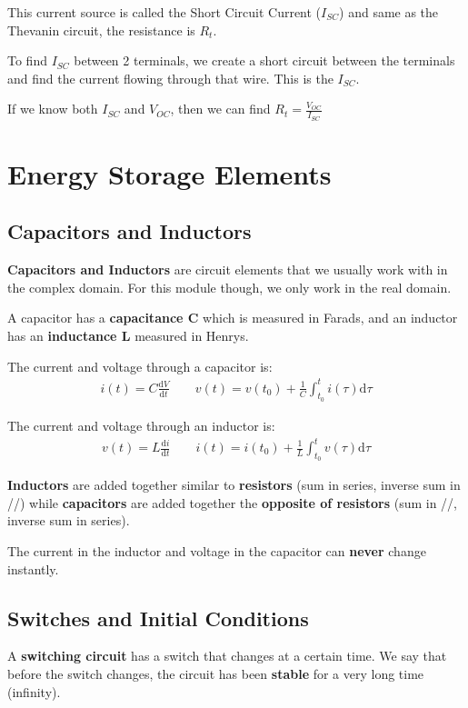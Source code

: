 \documentclass[12pt,letterpaper]{article} \usepackage{amsmath} \usepackage{graphicx} \usepackage[margin=1in]{geometry} \usepackage{longtable}  \usepackage{amssymb}
\begin{document}
	This current source is called the Short Circuit Current ($I_{SC}$) and same as the Thevanin circuit, the resistance is $R_t$.
	
	To find $I_{SC}$ between 2 terminals, we create a short circuit between the terminals and find the current flowing through that wire. This is the $I_{SC}$.
	
	If we know both $I_{SC}$ and $V_{OC}$, then we can find $R_t = \frac{V_{OC}}{I_{SC}}$
	
	\section{Energy Storage Elements}
	
	\subsection{Capacitors and Inductors}
	\textbf{Capacitors and Inductors} are circuit elements that we usually work with in the complex domain. For this module though, we only work in the real domain. 
	
	A capacitor has a \textbf{capacitance C} which is measured in Farads, and an inductor has an \textbf{inductance L} measured in Henrys. 
	
	The current and voltage through a capacitor is:
	\begin{align*}
		i(t)=C\frac{\mathrm{d}V}{\mathrm{d}t}\qquad v(t)=v(t_0) + \frac{1}{C}\int^t_{t_0} i(\tau) \mathrm{d}\tau
	\end{align*}
	
	The current and voltage through an inductor is: 
	\begin{align*}
		v(t)=L\frac{\mathrm{d}i}{\mathrm{d}t}\qquad i(t)=i(t_0) + \frac{1}{L}\int^t_{t_0} v(\tau) \mathrm{d}\tau
	\end{align*}

	\textbf{Inductors} are added together similar to \textbf{resistors} (sum in series, inverse sum in //) while \textbf{capacitors} are added together the \textbf{opposite of resistors }(sum in //, inverse sum in series).
	
	The current in the inductor and voltage in the capacitor can \textbf{never} change instantly.
	
	\subsection{Switches and Initial Conditions}
	A \textbf{switching circuit} has a switch that changes at a certain time. We say that before the switch changes, the circuit has been \textbf{stable} for a very long time (infinity).
	
\end{document}
